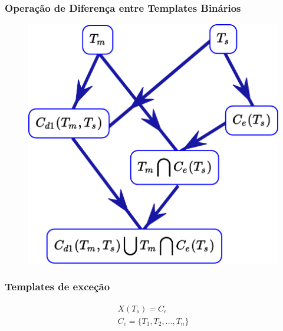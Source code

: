 \documentclass[aspectratio=43,hyperref={pdfpagelabels=false}]{beamer}
\begin{document}
  \begin{frame}
    \frametitle{Operação de Diferença entre Templates Binários}
    \begin{figure}[h!]
      \centering
      \includegraphics[width=.4\textwidth]{grafico2c.pdf}
    \end{figure}
 \end{frame}


 \begin{frame}
     \frametitle{Templates de exceção}

      \begin{equation}
      \begin{split}
      X(T_o)= C_e \\
      C_e = \{T_1,T_2,\dots, T_n\}\\
      \end{split}
      \end{equation}     
 \end{frame}
\end{document}
